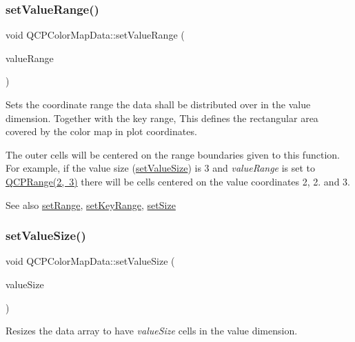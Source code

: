 \subsubsection{\texorpdfstring{setValueRange()}{setValueRange()}}
{\footnotesize\ttfamily void Q\+C\+P\+Color\+Map\+Data\+::set\+Value\+Range (\begin{DoxyParamCaption}\item[{const \mbox{\hyperlink{class_q_c_p_range}{Q\+C\+P\+Range}} \&}]{value\+Range }\end{DoxyParamCaption})}

Sets the coordinate range the data shall be distributed over in the value dimension. Together with the key range, This defines the rectangular area covered by the color map in plot coordinates.

The outer cells will be centered on the range boundaries given to this function. For example, if the value size (\mbox{\hyperlink{class_q_c_p_color_map_data_a0893c9e3914513048b45e3429ffd16f2}{set\+Value\+Size}}) is 3 and {\itshape value\+Range} is set to {\ttfamily \mbox{\hyperlink{class_q_c_p_range}{Q\+C\+P\+Range(2, 3)}}} there will be cells centered on the value coordinates 2, 2. and 3.

\begin{DoxySeeAlso}{See also}
\mbox{\hyperlink{class_q_c_p_color_map_data_aad9c1c7c703c1339489fc730517c83d4}{set\+Range}}, \mbox{\hyperlink{class_q_c_p_color_map_data_a0738c485f3c9df9ea1241b7a8bb6a86e}{set\+Key\+Range}}, \mbox{\hyperlink{class_q_c_p_color_map_data_a0d9ff35c299d0478b682bfbcdd9c097e}{set\+Size}} 
\end{DoxySeeAlso}
\mbox{\label{class_q_c_p_color_map_data_a0893c9e3914513048b45e3429ffd16f2}} 
\subsubsection{\texorpdfstring{setValueSize()}{setValueSize()}}
{\footnotesize\ttfamily void Q\+C\+P\+Color\+Map\+Data\+::set\+Value\+Size (\begin{DoxyParamCaption}\item[{int}]{value\+Size }\end{DoxyParamCaption})}

Resizes the data array to have {\itshape value\+Size} cells in the value dimension.

